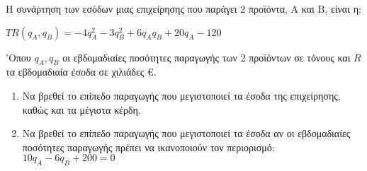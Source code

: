 \documentclass[12pt,a4paper]{article}
\begin{document}
Η συνάρτηση των εσόδων μιας επιχείρησης που παράγει 2 προϊόντα, Α και Β, είναι η: \\


\begin{center}
$TR(q_A,q_B) = -4q_A^2 - 3q_B^2 + 6q_A q_B + 20 q_A - 120 $
\end{center}


'Οπου $q_A,q_B$ οι εβδομαδιαίες ποσότητες παραγωγής των 2 προϊόντων σε τόνους και $R$ τα εβδομαδιαία έσοδα σε χιλιάδες \euro.\\

\begin{enumerate}
\item Να βρεθεί το επίπεδο παραγωγής που μεγιστοποιεί τα έσοδα της επιχείρησης, καθώς και τα μέγιστα κέρδη.\\
\item Να βρεθεί το επίπεδο παραγωγής που μεγιστοποιεί τα έσοδα αν οι εβδομαδιαίες ποσότητες παραγωγής πρέπει να ικανοποιούν τον περιορισμό:$10q_A-6q_B+200=0$
\end{enumerate}
\end{document}
